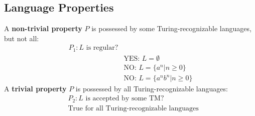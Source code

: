 \documentclass{article}
\begin{document}
\subsection{Language Properties}
A \textbf{non-trivial property} $P$ is possessed by some Turing-recognizable languages, but not all:
\begin{align*}
    P_1 : L \text{ is regular?} \\
    &\text{YES: } L = \emptyset \\ 
    &\text{NO: } L = \{a^n|n\geq 0\} \\ 
    &\text{NO: } L = \{a^nb^n | n\geq 0\}
\end{align*}
A \textbf{trivial property} $P$ is possessed by all Turing-recognizable languages:
\begin{align*}
    &P_2 : L \text{ is accepted by some TM?} \\
    &\text{True for all Turing-recognizable languages}
\end{align*}

\newpage

\end{document}
